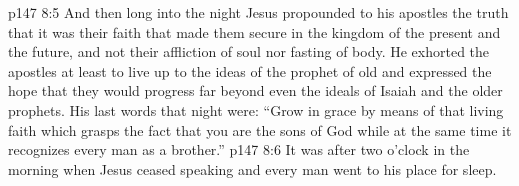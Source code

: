 \vs p147 8:5 \pc And then long into the night Jesus propounded to his apostles the truth that it was their faith that made them secure in the kingdom of the present and the future, and not their affliction of soul nor fasting of body. He exhorted the apostles at least to live up to the ideas of the prophet of old and expressed the hope that they would progress far beyond even the ideals of Isaiah and the older prophets. His last words that night were: \textcolor{ubdarkred}{“Grow in grace by means of that living faith which grasps the fact that you are the sons of God while at the same time it recognizes every man as a brother.”}
\vs p147 8:6 It was after two o’clock in the morning when Jesus ceased speaking and every man went to his place for sleep.
